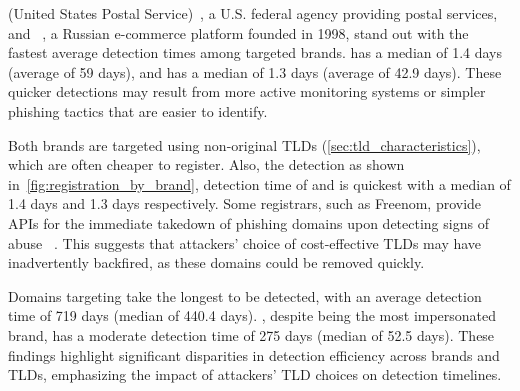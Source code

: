  (United States Postal Service)~\cite{WelcomeU93:online}, a U.S. federal agency providing postal services, and ~\cite{OZON}, a Russian e-commerce platform founded in 1998, stand out with the fastest average detection times among targeted brands. 
 has a median of 1.4 days (average of 59 days), and  has a median of 1.3 days (average of 42.9 days).
These quicker detections may result from more active monitoring systems or simpler phishing tactics that are easier to identify. 

Both brands are targeted using non-original TLDs (\autoref{sec:tld_characteristics}), which are often cheaper to register. 
Also, the detection as shown in~\autoref{fig:registration_by_brand}, detection time of  and  is quickest with a median of 1.4 days and 1.3 days respectively.
Some registrars, such as Freenom, provide APIs for the immediate takedown of phishing domains upon detecting signs of abuse ~\cite{affinito2022domain}. 
This suggests that attackers' choice of cost-effective TLDs may have inadvertently backfired, as these domains could be removed quickly.

Domains targeting  take the longest to be detected, with an average detection time of 719 days (median of 440.4 days).
, despite being the most impersonated brand, has a moderate detection time of 275 days (median of 52.5 days).
These findings highlight significant disparities in detection efficiency across brands and TLDs, emphasizing the impact of attackers' TLD choices on detection timelines.



